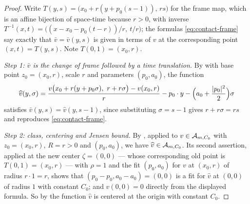 \begin{proof}
Write $T(y,s)=\bigl(x_0+r(y+p_0(s-1)),\,rs\bigr)$ for the frame map, which is an
affine bijection of space-time because $r>0$, with inverse
$T^{-1}(x,t)=\bigl((x-x_0-p_0(t-r))/r,\ t/r\bigr)$; the formulas
\eqref{eq:contact-frame} say exactly that $\bar v=\bar v(y,s)$ is given in terms
of $v$ at the corresponding point $(x,t)=T(y,s)$. Note $T(0,1)=(x_0,r)$.

\emph{Step 1: $\bar v$ is the change of frame followed by a time translation.}
By  with base point $z_0=(x_0,r)$, scale $r$ and parameters
$(p_0,a_0)$, the function
\[
  \widehat v(y,\sigma)
   =\frac{v\bigl(x_0+r(y+p_0\sigma),\ r+r\sigma\bigr)-v(x_0,r)}{r}
     -p_0\cdot y-\Bigl(a_0+\frac{|p_0|^2}{2}\Bigr)\sigma
\]
satisfies $\bar v(y,s)=\widehat v(y,s-1)$, since substituting $\sigma=s-1$ gives
$r+r\sigma=rs$ and reproduces \eqref{eq:contact-frame}.

\emph{Step 2: class, centering and Jensen bound.}
By , applied to $v\in\mathcal{A}_{m,C_0}$ with $z_0=(x_0,r)$,
$R=r>0$ and $(p_0,a_0)$, we have $\widehat v\in\mathcal{A}_{m,C_0}$. Its second
assertion, applied at the new center $\zeta=(0,0)$ — whose corresponding old
point is $T(0,1)=(x_0,r)$ — with $\rho=1$ and the fit $(p_0,a_0)$ for $v$ at
$(x_0,r)$ of radius $r\cdot1=r$, shows that $(p_0-p_0,a_0-a_0)=(0,0)$ is a fit
for $\widehat v$ at $(0,0)$ of radius $1$ with constant $C_0$; and
$\widehat v(0,0)=0$ directly from the displayed formula. So by
 the function $\widehat v$ is centered at the origin with
constant $C_0$.


\end{proof}
